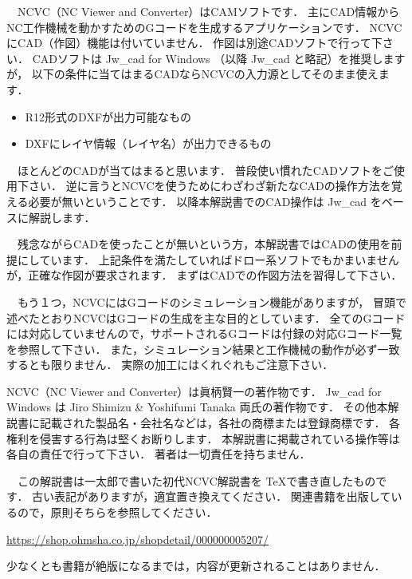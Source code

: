 

\vspace*{2zh}
　NCVC（NC Viewer and Converter）はCAMソフトです．
主にCAD情報からNC工作機械を動かすためのGコードを生成するアプリケーションです．
NCVCにCAD（作図）機能は付いていません．
作図は別途CADソフトで行って下さい．
CADソフトは Jw\_cad for Windows （以降 Jw\_cad と略記）を推奨しますが，
以下の条件に当てはまるCADならNCVCの入力源としてそのまま使えます．

\begin{itemize}
    \item R12形式のDXFが出力可能なもの
    \item DXFにレイヤ情報（レイヤ名）が出力できるもの
\end{itemize}

　ほとんどのCADが当てはまると思います．
普段使い慣れたCADソフトをご使用下さい．
逆に言うとNCVCを使うためにわざわざ新たなCADの操作方法を覚える必要が無いということです．
以降本解説書でのCAD操作は Jw\_cad をベースに解説します．

　残念ながらCADを使ったことが無いという方，本解説書ではCADの使用を前提にしています．
上記条件を満たしていればドロー系ソフトでもかまいませんが，正確な作図が要求されます．
まずはCADでの作図方法を習得して下さい．

　もう１つ，NCVCにはGコードのシミュレーション機能がありますが，
冒頭で述べたとおりNCVCはGコードの生成を主な目的としています．
全てのGコードには対応していませんので，サポートされるGコードは付録の対応Gコード一覧を参照して下さい．
また，シミュレーション結果と工作機械の動作が必ず一致するとも限りません．
実際の加工にはくれぐれもご注意下さい．

\vspace*{2zh}
\begin{center}
\begin{minipage}{10cm}
\begin{screen}
NCVC（NC Viewer and Converter）は眞柄賢一の著作物です．
Jw\_cad for Windows は Jiro Shimizu \& Yoshifumi Tanaka 両氏の著作物です．
その他本解説書に記載された製品名・会社名などは，各社の商標または登録商標です．
各権利を侵害する行為は堅くお断りします．
本解説書に掲載されている操作等は各自の責任で行って下さい．
著者は一切責任を持ちません．  
\end{screen}
\end{minipage}
\end{center}

\vspace*{2zh}
\begin{boxnote}
　この解説書は一太郎で書いた初代NCVC解説書を \TeX で書き直したものです．
古い表記がありますが，適宜置き換えてください．
関連書籍を出版しているので，原則そちらを参照してください．
\begin{center}
\url{https://shop.ohmsha.co.jp/shopdetail/000000005207/}
\end{center}
少なくとも書籍が絶版になるまでは，内容が更新されることはありません．
\end{boxnote}